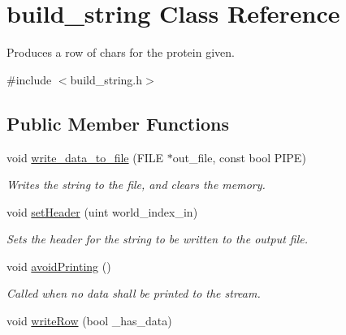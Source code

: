 \hypertarget{classbuild__string}{
\section{build\_\-string Class Reference}
\label{classbuild__string}
}


Produces a row of chars for the protein given.  




{\ttfamily \#include $<$build\_\-string.h$>$}

\subsection*{Public Member Functions}
\begin{DoxyCompactItemize}
\item 
\hypertarget{classbuild__string_a19419eab161e1efd271b10b261f70c4f}{
void \hyperlink{classbuild__string_a19419eab161e1efd271b10b261f70c4f}{write\_\-data\_\-to\_\-file} (FILE $\ast$out\_\-file, const bool PIPE)}
\label{classbuild__string_a19419eab161e1efd271b10b261f70c4f}

\begin{DoxyCompactList}\small\item\em Writes the string to the file, and clears the memory. \end{DoxyCompactList}\item 
\hypertarget{classbuild__string_a50d30ff1b5907505f1bb6c0dcfb2bdf1}{
void \hyperlink{classbuild__string_a50d30ff1b5907505f1bb6c0dcfb2bdf1}{setHeader} (uint world\_\-index\_\-in)}
\label{classbuild__string_a50d30ff1b5907505f1bb6c0dcfb2bdf1}

\begin{DoxyCompactList}\small\item\em Sets the header for the string to be written to the output file. \end{DoxyCompactList}\item 
\hypertarget{classbuild__string_aede88335fe17c08e79037062a643ebe3}{
void \hyperlink{classbuild__string_aede88335fe17c08e79037062a643ebe3}{avoidPrinting} ()}
\label{classbuild__string_aede88335fe17c08e79037062a643ebe3}

\begin{DoxyCompactList}\small\item\em Called when no data shall be printed to the stream. \end{DoxyCompactList}\item 
\hypertarget{classbuild__string_a98333ab6b8a689c1193484968034e4a2}{
void \hyperlink{classbuild__string_a98333ab6b8a689c1193484968034e4a2}{writeRow} (bool \_\-has\_\-data)}
\label{classbuild__string_a98333ab6b8a689c1193484968034e4a2}


\end{DoxyCompactItemize}

